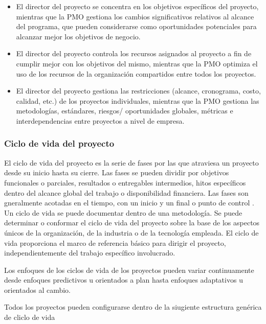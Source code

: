 \begin{itemize}

\item{El director del proyecto se concentra en los objetivos específicos del proyecto, mientras que la PMO 
gestiona los cambios significativos relativos al alcance del programa, que pueden considerarse como 
oportunidades potenciales para alcanzar mejor los objetivos de negocio.}

\item{El  director  del  proyecto  controla  los  recursos  asignados  al  proyecto  a  fin  de  cumplir  mejor  con  
los  objetivos  del  mismo,  mientras  que  la  PMO  optimiza  el  uso  de  los  recursos  de  la  organización  
compartidos entre todos los proyectos.}

\item{El  director  del  proyecto  gestiona  las  restricciones  (alcance,  cronograma,  costo,  calidad,  etc.)  de  
los  proyectos  individuales,  mientras  que  la  PMO  gestiona  las  metodologías,  estándares,  riesgos/
oportunidades globales, métricas e interdependencias entre proyectos a nivel de empresa.}

\end{itemize}


\subsubsection{Ciclo de vida del proyecto}

El ciclo de vida del proyecto es la serie de fases por las que atraviesa un proyecto desde su inicio hasta su cierre. Las fases se pueden dividir por objetivos funcionales o parciales, resultados o entregables intermedios, hitos específicos dentro del alcance global del trabajo o disponibilidad financiera. Las fases son gneralmente acotadas en el tiempo, con un inicio y un final o punto de control . Un ciclo de vida se puede documentar dentro de una metodología. Se puede determinar o conformar el ciclo de vida del proyecto sobre la base de los aspectos únicos de la organización, de la industria o de la tecnología empleada. El ciclo de vida proporciona el marco de referencia básico para dirigir el proyecto, independientemente del trabajo específico involucrado.

Los enfoques de los ciclos de vida de los proyectos pueden variar continuamente desde enfoques predictivos u orientados a plan hasta enfoques adaptativos u orientados al cambio.

Todos los proyectos pueden configurarse dentro de la siugiente estructura genérica de cliclo de vida

